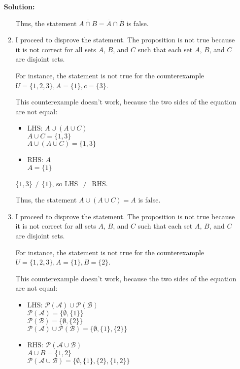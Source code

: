 \documentclass{article}
\newenvironment{solution}
{
\par
\color{blue}
\textbf{Solution:}
}
{
\par
}
\begin{document}
\begin{enumerate}
\begin{solution}
\begin{enumerate}
        Thus, the statement $\overline{A \cap B} = \overline{A} \cap \overline{B}$ is false. \square
        
        \item I proceed to disprove the statement. The proposition is not true because it is not correct for all sets $A$, $B$, and $C$ such that each set $A$, $B$, and $C$ are disjoint sets.
        
        For instance, the statement is not true for the counterexample $U = \{1, 2, 3\}, A = \{1\}, c = \{3\}$.
        
        This counterexample doesn't work, because the two sides of the equation are not equal:
        \begin{itemize}
            \item LHS: $A \cup (A \cup C)$\\
            $A \cup C = \{1, 3\}$\\
            $A \cup (A \cup C) = \{1, 3\}$
            
            \item RHS: $A$\\
            $A = \{1\}$
        \end{itemize}
        
        $\{1, 3\} \neq \{1\}$, so LHS $\neq$ RHS.
        
        Thus, the statement $A \cup (A \cup C) = A$ is false. \square
        
        \item I proceed to disprove the statement. The proposition is not true because it is not correct for all sets $A$, $B$, and $C$ such that each set $A$, $B$, and $C$ are disjoint sets.
        
        For instance, the statement is not true for the counterexample $U = \{1, 2, 3\}, A = \{1\}, B = \{2\}$.
        
        This counterexample doesn't work, because the two sides of the equation are not equal:
        \begin{itemize}
            \item LHS: $\mathcal{P(A)} \cup \mathcal{P(B)}$ \\
            $\mathcal{P(A)} = \{\emptyset, \{1\}\}$\\
            $\mathcal{P(B)} = \{\emptyset, \{2\}\}$\\
            $\mathcal{P(A)} \cup \mathcal{P(B)} = \{\emptyset, \{1\}, \{2\}\}$
            
            \item RHS: $\mathcal{P(A \cup B)}$\\
            $A \cup B = \{1, 2\}$\\
            $\mathcal{P(A \cup B)} = \{\emptyset, \{1\}, \{2\}, \{1, 2\}\}$
        \end{itemize}
        

\end{enumerate}
\end{solution}
\end{enumerate}
\end{document}
